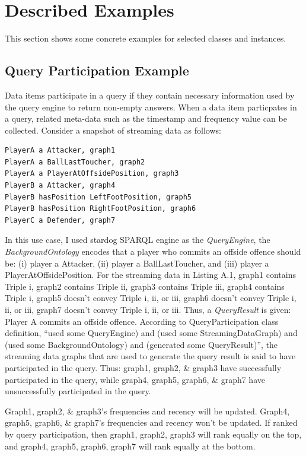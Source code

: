 \section{Described Examples}
This section shows some concrete examples for selected classes and instances. 
\subsection{Query Participation Example}
Data items participate in a query if they contain necessary information used by the query engine to return non-empty answers.
When a data item particpates in a query, related meta-data such as the timestamp and frequency value can be collected. 
Consider a snapshot of streaming data as follows:

\begin{lstlisting}[caption={Example Streaming Data}, label={lst:app-esd}]
PlayerA a Attacker, graph1
PlayerA a BallLastToucher, graph2
PlayerA a PlayerAtOffsidePosition, graph3
PlayerB a Attacker, graph4
PlayerB hasPosition LeftFootPosition, graph5
PlayerB hasPosition RightFootPosition, graph6
PlayerC a Defender, graph7
\end{lstlisting}

In this use case, I used stardog SPARQL engine as the \textit{QueryEngine}, the \textit{BackgroundOntology} encodes that a player who commits an offside offence should be: (i) player a Attacker, (ii) player a BallLastToucher, and (iii) player a PlayerAtOffsidePosition.
For the streaming data in Listing A.1, graph1 contains Triple i, graph2 contains Triple ii, graph3 contains Triple iii, graph4 contains Triple i, graph5 doesn’t convey Triple i, ii, or iii, graph6 doesn’t convey Triple i, ii, or iii, graph7 doesn’t convey Triple i, ii, or iii.
Thus, a \textit{QueryResult} is given: Player A commits an offside offence. 
According to QueryParticipation class definition,  ``used some QueryEngine) and (used some StreamingDataGraph) and (used some BackgroundOntology) and (generated some QueryResult)'', 
the streaming data graphs that are used to generate the query result is said to have participated in the query. 
Thus: graph1, graph2, \& graph3 have successfully participated in the query, while graph4, graph5, graph6, \& graph7 have unsuccessfully participated in the query.

Graph1, graph2, \& graph3's frequencies and recency will be updated.
Graph4, graph5, graph6, \& graph7’s frequencies and recency won’t be updated. 
If ranked by query participation, then graph1, graph2, graph3 will rank equally on the top, and graph4, graph5, graph6, graph7 will rank equally at the bottom.

